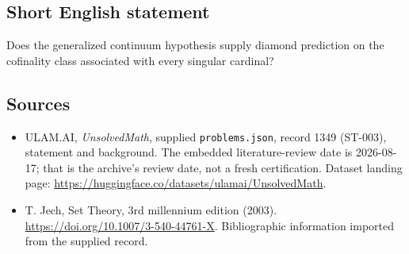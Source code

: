 \documentclass[11pt,a4paper]{article}
\begin{document}
\subsection{Short English statement}

Does the generalized continuum hypothesis supply diamond prediction on the cofinality class associated with every singular cardinal?

\subsection{Sources}

{\small

\begin{itemize}

\item[\hypertarget{source:1349:1}{S1}] ULAM.AI, \emph{UnsolvedMath}, supplied \texttt{problems.json}, record 1349 (ST-003), statement and background. The embedded literature-review date is 2026-08-17; that is the archive’s review date, not a fresh certification. Dataset landing page: \url{https://huggingface.co/datasets/ulamai/UnsolvedMath}.

\item[\hypertarget{source:1349:2}{S2}] T. Jech, Set Theory, 3rd millennium edition (2003). \url{https://doi.org/10.1007/3-540-44761-X}. Bibliographic information imported from the supplied record.

\end{itemize}

}

\label{end:1349}
\end{document}
